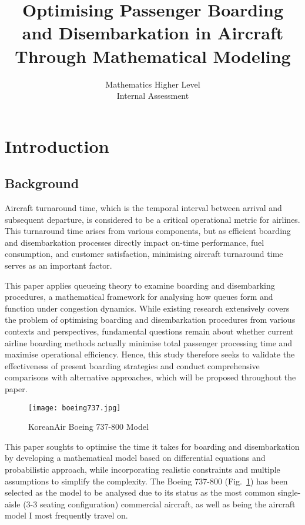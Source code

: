 \documentclass[12pt,a4paper]{article}
\title{Optimising Passenger Boarding and Disembarkation in Aircraft Through Mathematical Modeling}
\author{Mathematics Higher Level \\
Internal Assessment}
\date{}
\begin{document}
\maketitle

\section{Introduction}
\subsection{Background}

Aircraft turnaround time, which is the temporal interval between arrival and subsequent departure, is considered to be a critical operational metric for airlines. This turnaround time arises from various components, but as efficient boarding and disembarkation processes directly impact on-time performance, fuel consumption, and customer satisfaction, minimising aircraft turnaround time serves as an important factor.

This paper applies queueing theory to examine boarding and disembarking procedures, a mathematical framework for analysing how queues form and function under congestion dynamics. While existing research extensively covers the problem of optimising boarding and disembarkation procedures from various contexts and perspectives, fundamental questions remain about whether current airline boarding methods actually minimise total passenger processing time and maximise operational efficiency. Hence, this study therefore seeks to validate the effectiveness of present boarding strategies and conduct comprehensive comparisons with alternative approaches, which will be proposed throughout the paper.

\begin{figure}[H]
\centering
\texttt{[image: boeing737.jpg]}
\caption{KoreanAir Boeing 737-800 Model}
\label{fig:boeing737}
\end{figure}

This paper soughts to optimise the time it takes for boarding and disembarkation by developing a mathematical model based on differential equations and probabilistic approach, while incorporating realistic constraints and multiple assumptions to simplify the complexity. The Boeing 737-800 (Fig.~\ref{fig:boeing737}) has been selected as the model to be analysed due to its status as the most common single-aisle (3-3 seating configuration) commercial aircraft, as well as being the aircraft model I most frequently travel on.
\end{document}
